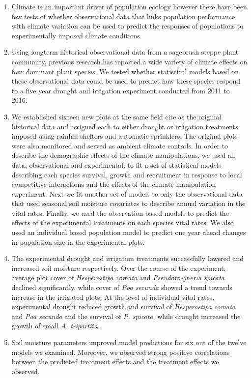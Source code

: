 \documentclass[11pt]{article}
\begin{document}
\begin{doublespacing}
\begin{enumerate}
\item Climate is an important driver of population ecology however there have been few tests of whether observational data that links population performance with climate variation can be used to predict the responses of populations to experimentally imposed climate conditions.   
\item Using longterm historical observational data from a sagebrush steppe plant community, previous research has reported a wide variety of climate effects on four dominant plant species. We tested whether statistical models based on these observational data could be used to predict how these species respond to a five year drought and irrigation experiment conducted from 2011 to 2016. 
\item We established sixteen new plots at the same field cite as the original historical data and assigned each to either drought or irrigation treatments imposed using rainfall shelters and automatic sprinklers. The original plots were also monitored and served as ambient climate controls. In order to describe the demographic effects of the climate manipulations, we used all data, observational and experimental, to fit a set of statistical models describing each species survival, growth and recruitment in response to local competitive interactions and the effects of the climate manipulation experiment. Next we fit another set of models to only the observational data that used seasonal soil moisture covariates to describe annual variation in the vital rates.  Finally, we used the observation-based models to predict the effects of the experimental treatments on each species vital rates. We also used an individual based population model to predict one year ahead changes in population size in the experimental plots.   
\item The experimental drought and irrigation treatments successfully lowered and increased soil moisture respectively.  Over the course of the experiment, average plot cover of \textit{Hesperostipa comata} and \textit{Pseudoroegneria spicata} declined significantly, while cover of \textit{Poa secunda} showed a trend towards increase in the irrigated plots. At the level of individual vital rates, experimental drought reduced growth and survival of \textit{Hesperostipa comata} and \textit{Poa secunda} and the survival of \textit{P. spicata}, while drought increased the growth of small \textit{A. tripartita}. 
\item Soil moisture parameters improved model predictions for six out of the twelve models we examined.  Moreover, we observed strong positive correlations between the predicted treatment effects and the treatment effects we observed.   

\end{enumerate}
\end{doublespacing}
\end{document}
